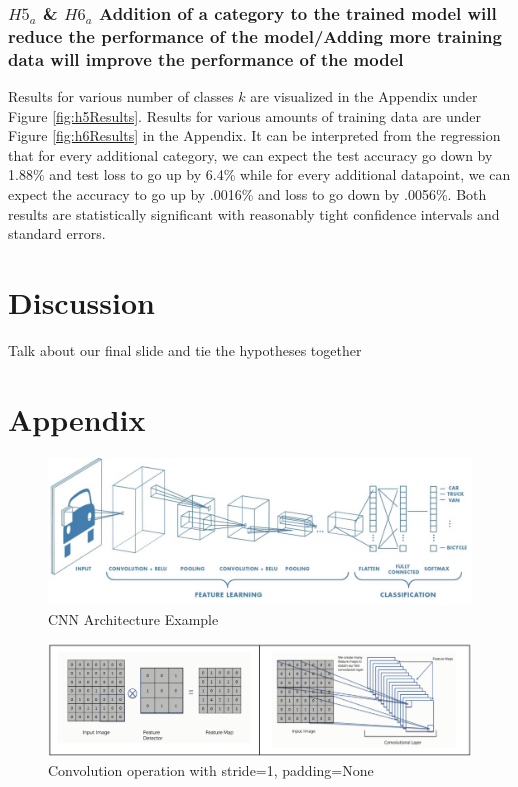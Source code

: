 \documentclass[11pt]{article}
\begin{document}
\subsubsection{$H5_a$ \& $H6_a$\: Addition of a category to the trained model
  will reduce the performance of the model/Adding more training data will
  improve the performance of the model}

Results for various number of classes $k$ are visualized in the Appendix
under Figure \ref{fig:h5Results}. Results for various amounts of training
data are under Figure \ref{fig:h6Results} in the Appendix. It can be
interpreted from the regression that for every additional category,
we can expect the test accuracy go down by 1.88\% and test loss to go up by
6.4\% while for every additional datapoint, we can expect the accuracy to go
up by .0016\% and loss to go down by .0056\%. Both results are statistically
significant with reasonably tight confidence intervals and standard errors.

\section{Discussion}

Talk about our final slide and tie the hypotheses together




\section{Appendix}


\begin{figure}[h!]
  \begin{center}
    \includegraphics[scale=0.5]{fig5}
    \end{center}
  \caption{CNN Architecture Example}
  \label{fig:CNN}
\end{figure}

\begin{figure}[h!]
  \begin{center}
    \includegraphics[scale=0.5]{fig6}
    \end{center}
  \caption{Convolution operation with stride=1, padding=None}
  \label{fig:CNNStridePad}
\end{figure}
\end{document}
